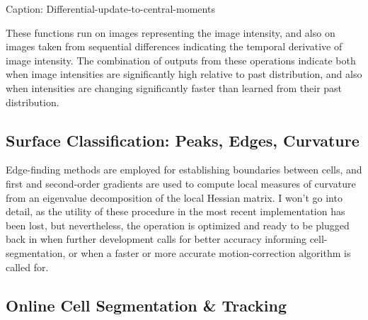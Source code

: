 \documentclass[../main.tex]{subfiles}
\begin{document}

Caption: Differential-update-to-central-moments

These functions run on images representing the image intensity, and also on images taken from sequential differences indicating the temporal derivative of image intensity.
The combination of outputs from these operations indicate both when image intensities are significantly high relative to past distribution, and also when intensities are changing significantly faster than learned from their past distribution.

\subsection{
	Surface Classification: Peaks, Edges, Curvature}\label{surface-classification-peaks-edges-curvature}

Edge-finding methods are employed for establishing boundaries between cells, and first and second-order gradients are used to compute local measures of curvature from an eigenvalue decomposition of the local Hessian matrix.
I won't go into detail, as the utility of these procedure in the most recent implementation has been lost, but nevertheless, the operation is optimized and ready to be plugged back in when further development calls for better accuracy informing cell-segmentation, or when a faster or more accurate motion-correction algorithm is called for.

\subsection{
	Online Cell Segmentation \& Tracking}\label{online-cell-segmentation-tracking}
\end{document}
